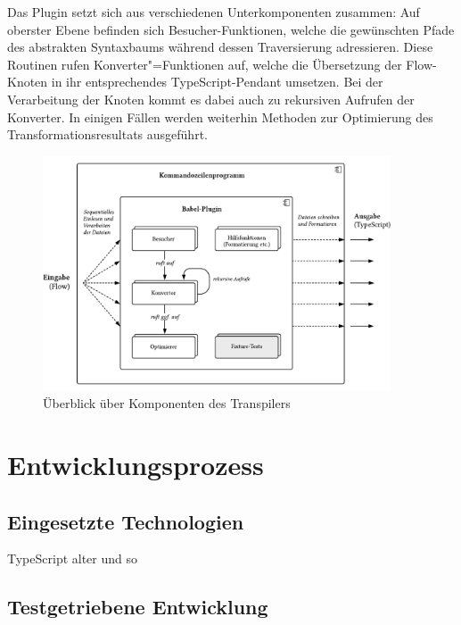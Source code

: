 Das Plugin setzt sich aus verschiedenen Unterkomponenten zusammen: Auf oberster Ebene befinden sich Besucher-Funktionen, welche die gewünschten Pfade des abstrakten Syntaxbaums während dessen Traversierung adressieren. Diese Routinen rufen Konverter"=Funktionen auf, welche die Übersetzung der Flow-Knoten in ihr entsprechendes TypeScript-Pendant umsetzen.
Bei der Verarbeitung der Knoten kommt es dabei auch zu rekursiven Aufrufen der Konverter. In einigen Fällen werden weiterhin Methoden zur Optimierung des Transformationsresultats ausgeführt.

\begin{figure}[tbp]
  \centering
  \includegraphics[width=0.92\textwidth]{src/4_Umsetzung/img/architecture-overview.pdf}
	\caption{Überblick über Komponenten des Transpilers}
	\label{fig:architecture-overview}
\end{figure}

\section{Entwicklungsprozess}

\subsection{Eingesetzte Technologien}

TypeScript alter und so

\subsection{Testgetriebene Entwicklung}


